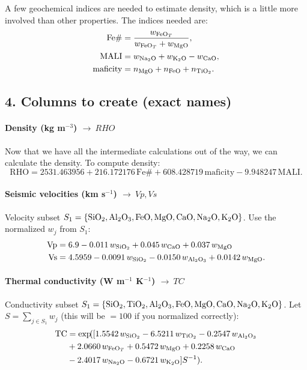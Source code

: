 \documentclass[11pt,a4paper]{article}
\begin{document}
A few geochemical indices are needed to estimate density, which is a little more involved than other properties.  The indices needed are:
\begin{align*}
  \mathrm{Fe\#} &= \frac{w_{\ce{FeO}_{T}}}{w_{\ce{FeO}_{T}} + w_{\ce{MgO}}},\\
  \mathrm{MALI} &= w_{\ce{Na2O}} + w_{\ce{K2O}} - w_{\ce{CaO}},\\
  \mathrm{maficity} &= n_{\ce{MgO}} + n_{\ce{FeO}} + n_{\ce{TiO2}}.
\end{align*}

\subsection*{4. Columns to create (exact names)}

\paragraph{Density (kg m$^{-3}$) \(\to\ RHO\)}

Now that we have all the intermediate calculations out of the way, we can calculate the density.  To compute density:
\[
  \mathrm{RHO} = 2531.463956 + 216.172176\,\mathrm{Fe\#}
  + 608.428719\,\mathrm{maficity} - 9.948247\,\mathrm{MALI}.
\]

\paragraph{Seismic velocities (km s$^{-1}$) \(\to\ Vp, Vs\)}

Velocity subset \(S_1 = \{\ce{SiO2},\ce{Al2O3},\ce{FeO},\ce{MgO},\ce{CaO},\ce{Na2O},\ce{K2O}\}\).
Use the normalized \(w_j\) from \(S_1\):
\begin{align*}
  \mathrm{Vp} &= 6.9 - 0.011\,w_{\ce{SiO2}}
  + 0.045\,w_{\ce{CaO}} + 0.037\,w_{\ce{MgO}}\\
  \mathrm{Vs} &= 4.5959 - 0.0091\,w_{\ce{SiO2}}
  - 0.0150\,w_{\ce{Al2O3}} + 0.0142\,w_{\ce{MgO}}.
\end{align*}

\paragraph{Thermal conductivity (W m$^{-1}$ K$^{-1}$) \(\to\ TC\)}

Conductivity subset \(S_1 = \{\ce{SiO2},\ce{TiO2},\ce{Al2O3},\ce{FeO},\ce{MgO},\ce{CaO},\ce{Na2O},\ce{K2O}\}\).
Let \(S = \sum_{j \in S_1} w_j\) (this will be \(=100\) if you normalized correctly):
\begin{align*}
  \mathrm{TC} &= \exp\!(
  [ 1.5542\,w_{\ce{SiO2}}
  - 6.5211\,w_{\ce{TiO2}}
  - 0.2547\,w_{\ce{Al2O3}} \\
  &+ 2.0660\,w_{\ce{FeO}_{T}}
  + 0.5472\,w_{\ce{MgO}}
  + 0.2258\,w_{\ce{CaO}} \\
  &- 2.4017\,w_{\ce{Na2O}}
  - 0.6721\,w_{\ce{K2O}} ] S^{-1}).
\end{align*}
\end{document}
